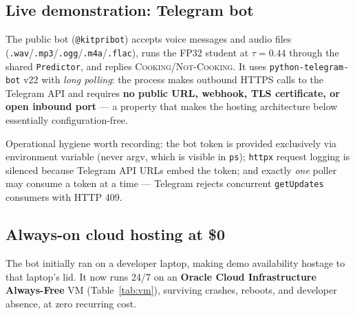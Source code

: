 \documentclass[11pt,a4paper]{article}
\newcommand{\cooking}{\textsc{Cooking}}
\newcommand{\notcooking}{\textsc{Not-Cooking}}
\begin{document}
\subsection{Live demonstration: Telegram bot}\label{sec:bot}

The public bot (\texttt{@kitpribot}) accepts voice messages and audio files
(\texttt{.wav}/\texttt{.mp3}/\texttt{.ogg}/\texttt{.m4a}/\texttt{.flac}),
runs the FP32 student at $\tau=0.44$ through the shared \texttt{Predictor},
and replies \cooking{}/\notcooking{}. It uses \texttt{python-telegram-bot}
v22 with \emph{long polling}: the process makes outbound HTTPS calls to the
Telegram API and requires \textbf{no public URL, webhook, TLS certificate, or
open inbound port} --- a property that makes the hosting architecture below
essentially configuration-free.

Operational hygiene worth recording: the bot token is provided exclusively
via environment variable (never argv, which is visible in \texttt{ps});
\texttt{httpx} request logging is silenced because Telegram API URLs embed
the token; and exactly \emph{one} poller may consume a token at a time ---
Telegram rejects concurrent \texttt{getUpdates} consumers with HTTP 409.

\subsection{Always-on cloud hosting at \$0}\label{sec:cloud}

The bot initially ran on a developer laptop, making demo availability
hostage to that laptop's lid. It now runs 24/7 on an \textbf{Oracle Cloud
Infrastructure Always-Free} VM (Table~\ref{tab:vm}), surviving crashes,
reboots, and developer absence, at zero recurring cost.
\end{document}
